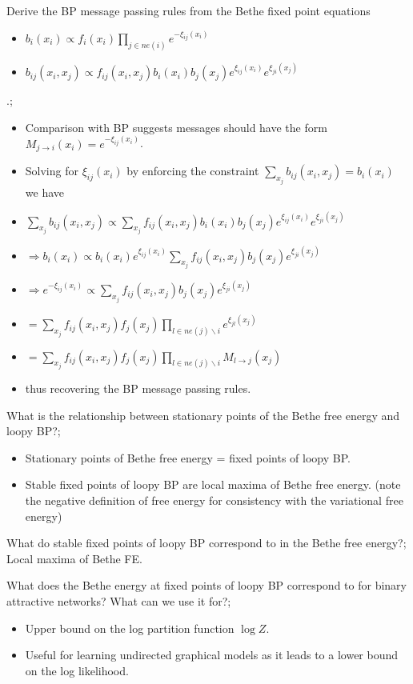 \documentclass{article}
\begin{document}
Derive the BP message passing rules from the Bethe fixed point equations \begin{itemize} \item $b_i(x_i) \propto f_i(x_i)\prod_{j\in ne(i)} e^{-\xi_{ij}(x_i)}$ \item $b_{ij}(x_i, x_j) \propto f_{ij}(x_i, x_j)b_i(x_i)b_j(x_j)e^{\xi_{ij}(x_i)}e^{\xi_{ji}(x_j)}$ \end{itemize}.; \begin{itemize} \item Comparison with BP suggests messages should have the form $M_{j\rightarrow i}(x_i) = e^{-\xi_{ij}(x_i)}$. \item Solving for $\xi_{ij}(x_i)$ by enforcing the constraint $\sum_{x_j} b_{ij}(x_i, x_j) = b_i(x_i)$ we have \item $\sum_{x_j} b_{ij}(x_i, x_j) \propto \sum_{x_j} f_{ij}(x_i, x_j)b_i(x_i)b_j(x_j)e^{\xi_{ij}(x_i)}e^{\xi_{ji}(x_j)}$ \item $\Rightarrow b_i(x_i) \propto b_i(x_i)e^{\xi_{ij}(x_i)}\sum_{x_j} f_{ij}(x_i, x_j)b_j(x_j)e^{\xi_{ji}(x_j)}$ \item $\Rightarrow e^{-\xi_{ij}(x_i)} \propto \sum_{x_j} f_{ij}(x_i, x_j)b_j(x_j)e^{\xi_{ji}(x_j)}$ \item $=\sum_{x_j} f_{ij}(x_i, x_j)f_j(x_j)\prod_{l\in ne(j)\backslash i}e^{\xi_{jl}(x_j)}$ \item $=\sum_{x_j} f_{ij}(x_i, x_j)f_j(x_j)\prod_{l\in ne(j)\backslash i}M_{l\rightarrow j}(x_j)$ \item thus recovering the BP message passing rules. \end{itemize}

What is the relationship between stationary points of the Bethe free energy and loopy BP?; \begin{itemize} \item Stationary points of Bethe free energy = fixed points of loopy BP. \item Stable fixed points of loopy BP are local maxima of Bethe free energy. (note the negative definition of free energy for consistency with the variational free energy) \end{itemize}

What do stable fixed points of loopy BP correspond to in the Bethe free energy?; Local maxima of Bethe FE.

What does the Bethe energy at fixed points of loopy BP correspond to for binary attractive networks? What can we use it for?; \begin{itemize} \item Upper bound on the log partition function $\log Z$. \item Useful for learning undirected graphical models as it leads to a lower bound on the log likelihood. \end{itemize}
\end{document}
